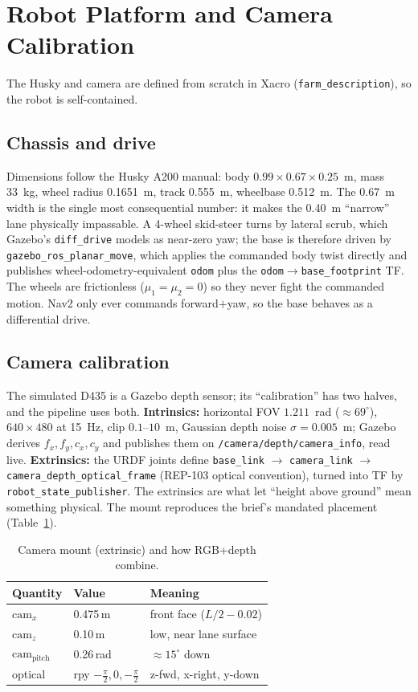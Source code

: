 \documentclass[10pt,journal,twoside]{IEEEtran}
\begin{document}
\section{Robot Platform and Camera Calibration}
The Husky and camera are defined from scratch in Xacro (\texttt{farm\_description}), so the robot is self-contained.

\subsection{Chassis and drive}
Dimensions follow the Husky A200 manual: body $0.99\times0.67\times0.25$~m, mass 33~kg, wheel radius 0.1651~m, track 0.555~m, wheelbase 0.512~m. The 0.67~m width is the single most consequential number: it makes the 0.40~m ``narrow'' lane physically impassable. A 4-wheel skid-steer turns by lateral scrub, which Gazebo's \texttt{diff\_drive} models as near-zero yaw; the base is therefore driven by \texttt{gazebo\_ros\_planar\_move}, which applies the commanded body twist directly and publishes wheel-odometry-equivalent \texttt{odom} plus the \texttt{odom$\rightarrow$base\_footprint} TF. The wheels are frictionless ($\mu_1{=}\mu_2{=}0$) so they never fight the commanded motion. Nav2 only ever commands forward$+$yaw, so the base behaves as a differential drive.

\subsection{Camera calibration}
The simulated D435 is a Gazebo depth sensor; its ``calibration'' has two halves, and the pipeline uses both. \textbf{Intrinsics:} horizontal FOV $1.211$~rad ($\approx 69^\circ$), $640\times480$ at 15~Hz, clip $0.1$--$10$~m, Gaussian depth noise $\sigma=0.005$~m; Gazebo derives $f_x,f_y,c_x,c_y$ and publishes them on \texttt{/camera/depth/camera\_info}, read live. \textbf{Extrinsics:} the URDF joints define \texttt{base\_link} $\rightarrow$ \texttt{camera\_link} $\rightarrow$ \texttt{camera\_depth\_optical\_frame} (REP-103 optical convention), turned into TF by \texttt{robot\_state\_publisher}. The extrinsics are what let ``height above ground'' mean something physical. The mount reproduces the brief's mandated placement (Table~\ref{tab:cam}).

\begin{table}[!t]
\centering
\caption{Camera mount (extrinsic) and how RGB+depth combine.}
\label{tab:cam}
\footnotesize
\begin{tabular}{@{}lll@{}}
\toprule
\textbf{Quantity} & \textbf{Value} & \textbf{Meaning} \\
\midrule
$\text{cam}_x$ & 0.475\,m & front face ($L/2-0.02$) \\
$\text{cam}_z$ & 0.10\,m & low, near lane surface \\
$\text{cam}_{\text{pitch}}$ & 0.26\,rad & $\approx 15^\circ$ down \\
optical & rpy $-\tfrac{\pi}{2},0,-\tfrac{\pi}{2}$ & z-fwd, x-right, y-down \\
\bottomrule
\end{tabular}
\end{table}
\end{document}
